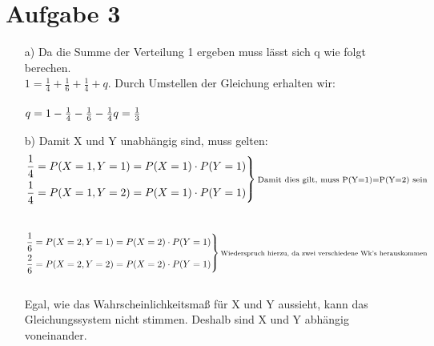 \documentclass[10pt,a4paper]{article}
\begin{document}
\section*{Aufgabe 3}
\begin{itemize}
\item[a)]Da die Summe der Verteilung 1 ergeben muss lässt sich q wie folgt berechen.\\
$1 = \frac{1}{4}+\frac{1}{6}+\frac{1}{4}+q$. Durch Umstellen der Gleichung erhalten wir:\\\\
$q = 1-\frac{1}{4}-\frac{1}{6}-\frac{1}{4} \newline
q = \frac{1}{3}$
\item[b)]Damit X und Y unabhängig sind, muss gelten:\\
\begin{equation}
  \left.
  \begin{aligned}
     \frac{1}{4} = P(X=1,Y=1) = P(X=1) \cdot P(Y=1)  \\
     \frac{1}{4} = P(X=1, Y=2) = P(X=1) \cdot P(Y=1)  
   \end{aligned}
   \right\}
  	\text{\scriptsize Damit dies gilt, muss P(Y=1)=P(Y=2) sein}
\end{equation}\\
\begin{equation}
  \left.
  \begin{aligned}
     \frac{1}{6} = P(X=2,Y=1) = P(X=2) \cdot P(Y=1)  \\
     \frac{2}{6} = P(X=2, Y=2) = P(X=2) \cdot P(Y=1)  
   \end{aligned}
   \right\}
   \text{\scriptsize Wiederspruch hierzu, da zwei verschiedene Wk's herauskommen}
\end{equation}\\
Egal, wie das Wahrscheinlichkeitsmaß für X und Y aussieht, kann das Gleichungssystem nicht stimmen. Deshalb sind X und Y abhängig voneinander. 
\end{itemize}
\end{document}
